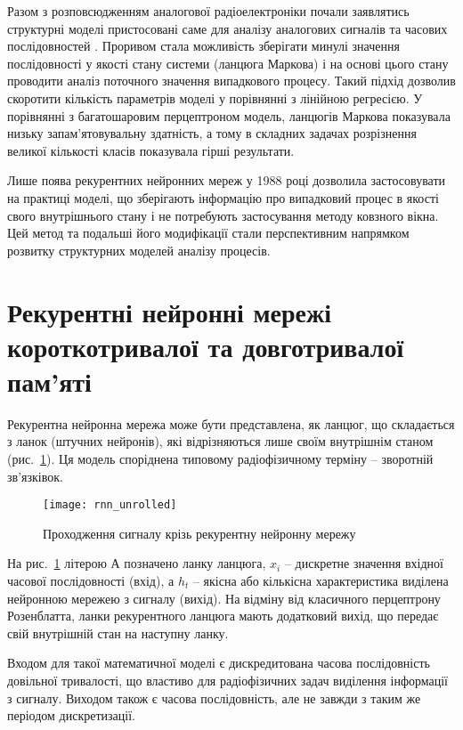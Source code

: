 Разом з розповсюдженням аналогової радіоелектроніки почали заявлятись 
структурні моделі пристосовані саме для аналізу аналогових сигналів 
та часових послідовностей \cite{imp:Markov1906}. Проривом стала можливість
зберігати минулі значення послідовності у якості стану системи 
(ланцюга Маркова) і на основі цього стану проводити аналіз поточного 
значення випадкового процесу. Такий підхід дозволив скоротити кількість 
параметрів моделі у порівнянні з лінійною регресією. У порівнянні з 
багатошаровим перцептроном модель, ланцюгів Маркова показувала низьку 
запам'ятовувальну здатність, а тому в складних задачах розрізнення великої 
кількості класів показувала гірші результати.

Лише поява рекурентних нейронних мереж у 1988 році \cite{imp:Rumelhart1988} 
дозволила застосовувати на практиці моделі, що зберігають інформацію про 
випадковий процес в якості свого внутрішнього стану і не потребують 
застосування методу ковзного вікна. Цей метод та подальші його модифікації
стали перспективним напрямком розвитку структурних моделей аналізу процесів. 

\section{Рекурентні нейронні мережі короткотривалої та довготривалої пам'яті}

Рекурентна нейронна мережа може бути представлена, як ланцюг, що складається
з ланок (штучних нейронів), які відрізняються лише своїм внутрішнім станом 
(рис.~\ref{fig:rnn_unrolled}). Ця модель споріднена типовому радіофізичному 
терміну -- зворотній зв'язківок.

\begin{figure}[htbp] \begin{center}
\texttt{[image: rnn\_unrolled]}
\caption{Проходження сигналу крізь рекурентну нейронну мережу}
\label{fig:rnn_unrolled}
\end{center} \end{figure}

На рис.~\ref{fig:rnn_unrolled} літерою А позначено ланку ланцюга, $ x_i $ --
дискретне значення вхідної часової послідовності (вхід), а $ h_t $ -- якісна 
або кількісна характеристика виділена нейронною мережею з сигналу (вихід). 
На відміну від класичного перцептрону Розенблатта, ланки рекурентного ланцюга 
мають додатковий вихід, що передає свій внутрішній стан на наступну ланку.

Входом для такої математичної моделі є дискредитована часова послідовність 
довільної тривалості, що властиво для радіофізичних задач виділення інформації
з сигналу. Виходом також є часова послідовність, але не завжди з таким же 
періодом дискретизації. 

